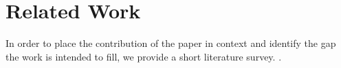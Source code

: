 \section{Related Work}\label{sec:relatedwork}
In order to place the contribution of the paper in context
  and identify the gap the work is intended to fill,
  we provide a short literature survey.
.




